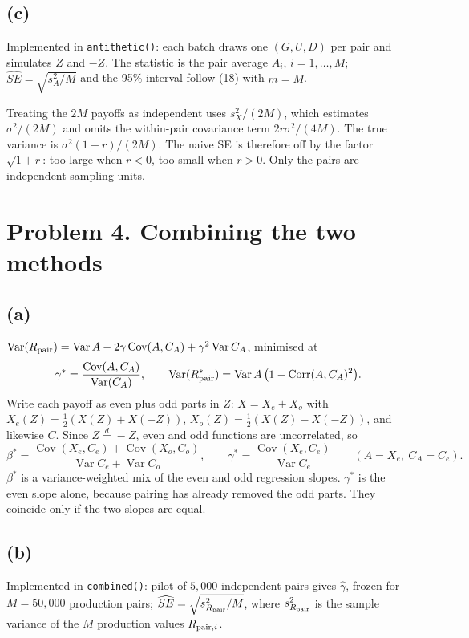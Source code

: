 \documentclass[10pt]{article}
\newcommand{\Var}{\operatorname{Var}}
\newcommand{\Cov}{\operatorname{Cov}}
\newcommand{\Corr}{\operatorname{Corr}}
\begin{document}
\subsection*{(c)}
Implemented in \texttt{antithetic()}: each batch draws one $(G,U,D)$ per pair and simulates $Z$ and
$-Z$. The statistic is the pair average $A_i$, $i=1,\dots,M$; $\widehat{SE}=\sqrt{s_A^2/M}$ and the 95\%
interval follow (18) with $m=M$.

Treating the $2M$ payoffs as independent uses $s_X^2/(2M)$, which estimates $\sigma^2/(2M)$ and omits
the within-pair covariance term $2r\sigma^2/(4M)$. The true variance is $\sigma^2(1+r)/(2M)$. The naive
SE is therefore off by the factor $\sqrt{1+r}$: too large when $r<0$, too small when $r>0$. Only the
pairs are independent sampling units.

\section*{Problem 4. Combining the two methods}

\subsection*{(a)}
$\Var(R_{\rm pair})=\Var A-2\gamma\Cov(A,C_A)+\gamma^2\Var C_A$, minimised at
\[
\gamma^*=\frac{\Cov(A,C_A)}{\Var(C_A)},\qquad \Var(R^*_{\rm pair})=\Var A\,\big(1-\Corr(A,C_A)^2\big).
\]
Write each payoff as even plus odd parts in $Z$: $X=X_e+X_o$ with
$X_e(Z)=\frac12(X(Z)+X(-Z))$, $X_o(Z)=\frac12(X(Z)-X(-Z))$, and likewise $C$. Since $Z\overset d=-Z$, even
and odd functions are uncorrelated, so
\[
\beta^*=\frac{\Cov(X_e,C_e)+\Cov(X_o,C_o)}{\Var C_e+\Var C_o},\qquad
\gamma^*=\frac{\Cov(X_e,C_e)}{\Var C_e}\qquad(A=X_e,\ C_A=C_e).
\]
$\beta^*$ is a variance-weighted mix of the even and odd regression slopes. $\gamma^*$ is the even slope
alone, because pairing has already removed the odd parts. They coincide only if the two slopes are equal.

\subsection*{(b)}
Implemented in \texttt{combined()}: pilot of $5{,}000$ independent pairs gives $\hat\gamma$, frozen for
$M=50{,}000$ production pairs; $\widehat{SE}=\sqrt{s^2_{R_{\rm pair}}/M}$, where $s^2_{R_{\rm pair}}$ is the
sample variance of the $M$ production values $R_{{\rm pair},i}$.
\end{document}
